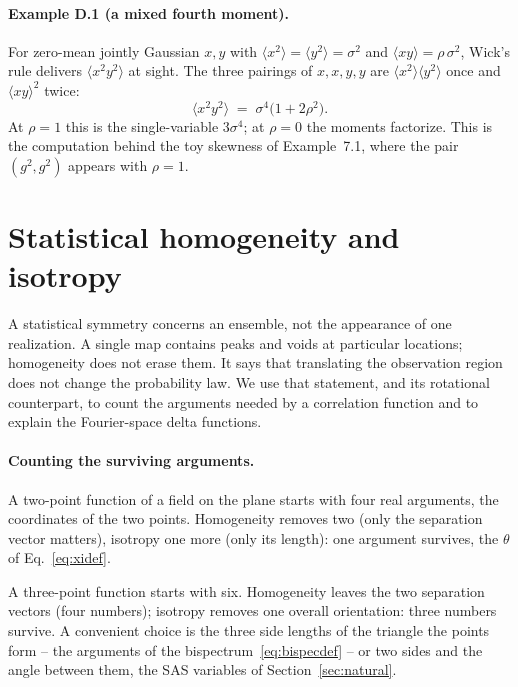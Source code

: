 \documentclass[11pt]{article}
\numberwithin{equation}{section}
\begin{document}
\paragraph{Example D.1 (a mixed fourth moment).}
For zero-mean jointly Gaussian $x, y$ with
$\langle x^2\rangle = \langle y^2\rangle = \sigma^2$ and
$\langle xy\rangle = \rho\,\sigma^2$, Wick's rule delivers
$\langle x^2 y^2\rangle$ at sight.  The three pairings of
$x, x, y, y$ are $\langle x^2\rangle\langle y^2\rangle$ once and
$\langle xy\rangle^2$ twice:
\begin{equation}
  \langle x^2 y^2 \rangle
  \;=\; \sigma^4\bigl(1 + 2\rho^2\bigr) .
  \label{eq:mixedfourth}
\end{equation}
At $\rho = 1$ this is the single-variable $3\sigma^4$; at
$\rho = 0$ the moments factorize.  This is the computation behind
the toy skewness of Example~7.1, where the pair
$(g^2, g^2)$ appears with $\rho = 1$.

\section{Statistical homogeneity and isotropy}
\label{app:homiso}

A statistical symmetry concerns an ensemble, not the appearance of one
realization. A single map contains peaks and voids at particular locations;
homogeneity does not erase them. It says that translating the observation
region does not change the probability law. We use that statement, and its
rotational counterpart, to count the arguments needed by a correlation
function and to explain the Fourier-space delta functions.

\paragraph{Counting the surviving arguments.}
A two-point function of a field on the plane starts with four real
arguments, the coordinates of the two points.  Homogeneity removes
two (only the separation vector matters), isotropy one more (only
its length): one argument survives, the $\theta$ of
Eq.~\eqref{eq:xidef}.

A three-point function starts with six.  Homogeneity leaves the two
separation vectors (four numbers); isotropy removes one overall
orientation: three numbers survive.  A convenient choice is the
three side lengths of the triangle the points form -- the arguments
of the bispectrum~\eqref{eq:bispecdef} -- or two sides and the
angle between them, the SAS variables of
Section~\ref{sec:natural}.
\end{document}
